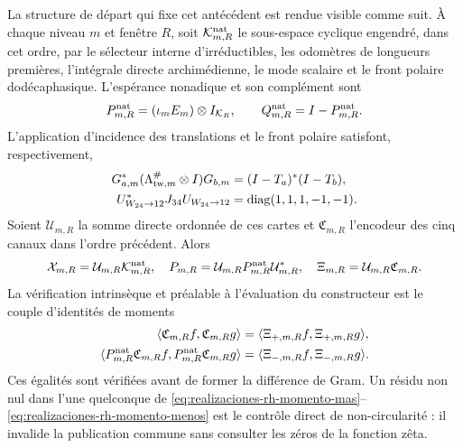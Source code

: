 La structure de départ qui fixe cet antécédent est rendue visible comme
suit. À chaque niveau \(m\) et fenêtre \(R\), soit
\(\mathcal K_{m,R}^{\rm nat}\) le sous-espace cyclique engendré, dans cet
ordre, par le sélecteur interne d'irréductibles, les odomètres de longueurs
premières, l'intégrale directe archimédienne, le mode scalaire et le front polaire
dodécaphasique. L'espérance nonadique et son complément sont
\begin{equation}\label{eq:realizaciones-rh-proyeccion-nativa}
 P_{m,R}^{\rm nat}=(\iota_mE_m)\otimes I_{\mathcal K_R},
 \qquad Q_{m,R}^{\rm nat}=I-P_{m,R}^{\rm nat}.
\end{equation}
L'application d'incidence des translations et le front polaire satisfont,
respectivement,
\begin{align}
 G_{a,m}^*(\Lambda_{{\rm tw},m}^{\#}\otimes I)G_{b,m}
 &=(I-T_a)^*(I-T_b),
 \label{eq:realizaciones-rh-momentos-cruzados}\\
 U_{W_{24}\to12}^*J_{34}U_{W_{24}\to12}
 &=\operatorname{diag}(1,1,1,-1,-1).
 \label{eq:realizaciones-rh-carta-polar}
\end{align}
Soient \(\mathcal U_{m,R}\) la somme directe ordonnée de ces cartes et
\(\mathfrak C_{m,R}\) l'encodeur des cinq canaux dans l'ordre
précédent. Alors
\begin{equation}\label{eq:realizaciones-rh-xi-p-fuente}
 \mathcal X_{m,R}=\mathcal U_{m,R}\mathcal K_{m,R}^{\rm nat},
 \quad
 P_{m,R}=\mathcal U_{m,R}P_{m,R}^{\rm nat}\mathcal U_{m,R}^*,
 \quad
 \Xi_{m,R}=\mathcal U_{m,R}\mathfrak C_{m,R}.
\end{equation}
La vérification intrinsèque et préalable à l'évaluation du constructeur est le
couple d'identités de moments
\begin{align}
 \langle\mathfrak C_{m,R}f,\mathfrak C_{m,R}g\rangle
 &=\langle\Xi_{+,m,R}f,\Xi_{+,m,R}g\rangle,
 \label{eq:realizaciones-rh-momento-mas}\\
 \langle P_{m,R}^{\rm nat}\mathfrak C_{m,R}f,
         P_{m,R}^{\rm nat}\mathfrak C_{m,R}g\rangle
 &=\langle\Xi_{-,m,R}f,\Xi_{-,m,R}g\rangle.
 \label{eq:realizaciones-rh-momento-menos}
\end{align}
Ces égalités sont vérifiées avant de former la différence de Gram. Un
résidu non nul dans l'une quelconque de
\eqref{eq:realizaciones-rh-momento-mas}--
\eqref{eq:realizaciones-rh-momento-menos} est le contrôle direct de
non-circularité : il invalide la publication commune sans consulter les zéros de la
fonction zêta.

